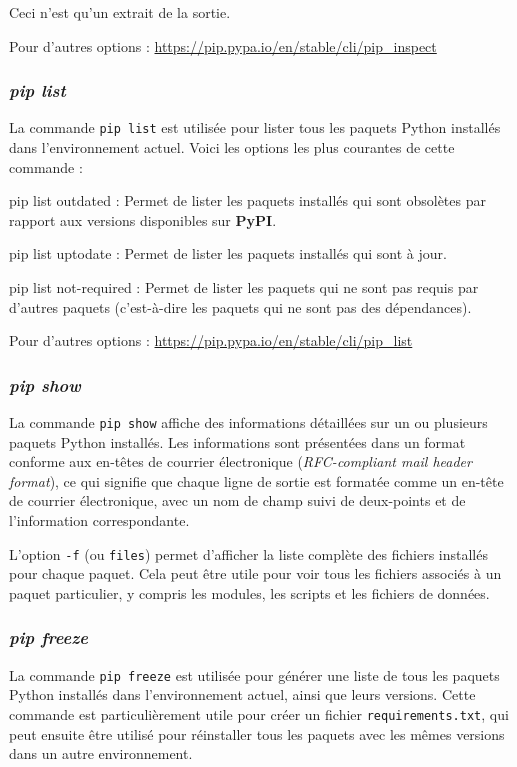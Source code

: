 Ceci n'est qu'un extrait de la sortie.

Pour d'autres options : \url{https://pip.pypa.io/en/stable/cli/pip_inspect}

\subsubsection*{\textit{pip list}}
La commande \texttt{pip list} est utilisée pour lister tous les paquets Python installés dans l'environnement actuel. Voici les options les plus courantes de cette commande :
\begin{optionlist}
\item [pip list \textendash\textendash outdated :] Permet de lister les paquets installés qui sont obsolètes par rapport aux versions disponibles sur \textbf{PyPI}.
\item [pip list \textendash\textendash uptodate :] Permet de lister les paquets installés qui sont à jour.
\item [pip list \textendash\textendash not-required :] Permet de lister les paquets qui ne sont pas requis par d'autres paquets (c'est-à-dire les paquets qui ne sont pas des dépendances).
\end{optionlist}

Pour d'autres options : \url{https://pip.pypa.io/en/stable/cli/pip_list}

\subsubsection*{\textit{pip show}}
La commande \texttt{pip show} affiche des informations détaillées sur un ou plusieurs paquets Python installés. Les informations sont présentées dans un format conforme aux en-têtes de courrier électronique (\textit{RFC-compliant mail header format}), ce qui signifie que chaque ligne de sortie est formatée comme un en-tête de courrier électronique, avec un nom de champ suivi de deux-points et de l'information correspondante.

L'option \texttt{-f} (ou \texttt{\textendash\textendash files}) permet d'afficher la liste complète des fichiers installés pour chaque paquet. Cela peut être utile pour voir tous les fichiers associés à un paquet particulier, y compris les modules, les scripts et les fichiers de données.

\subsubsection*{\textit{pip freeze}}
La commande \texttt{pip freeze} est utilisée pour générer une liste de tous les paquets Python installés dans l'environnement actuel, ainsi que leurs versions. Cette commande est particulièrement utile pour créer un fichier \texttt{requirements.txt}, qui peut ensuite être utilisé pour réinstaller tous les paquets avec les mêmes versions dans un autre environnement.

